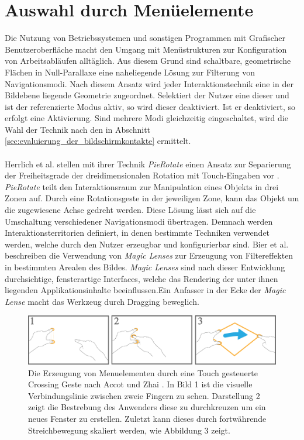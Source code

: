 \section{Auswahl durch Menüelemente}
\label{sec:menu_elemente}

Die Nutzung von Betriebssystemen und sonstigen Programmen mit Grafischer Benutzeroberfläche macht den Umgang mit Menüstrukturen zur Konfiguration von Arbeitsabläufen alltäglich. Aus diesem Grund sind schaltbare, geometrische Flächen in Null-Parallaxe eine naheliegende Lösung zur Filterung von Navigationsmodi. Nach diesem Ansatz wird jeder Interaktionstechnik eine in der Bildebene liegende Geometrie zugeordnet. Selektiert der Nutzer eine dieser und ist der referenzierte Modus aktiv, so wird dieser deaktiviert. Ist er deaktiviert, so erfolgt eine Aktivierung. Sind mehrere Modi gleichzeitig eingeschaltet, wird die Wahl der Technik nach den in Abschnitt \ref{sec:evaluierung_der_bildschirmkontakte} ermittelt.   
\\\\
Herrlich et al. stellen mit ihrer Technik \emph{PieRotate} einen Ansatz zur Separierung der Freiheitsgrade der dreidimensionalen Rotation mit Touch-Eingaben vor \cite{herrlich:2011}. \emph{PieRotate} teilt den Interaktionsraum zur Manipulation eines Objekts in drei Zonen auf. Durch eine Rotationsgeste in der jeweiligen Zone, kann das Objekt um die zugewiesene Achse gedreht werden. Diese Lösung lässt sich auf die Umschaltung verschiedener Navigationsmodi übertragen. Demnach werden Interaktionsterritorien definiert, in denen bestimmte Techniken verwendet werden, welche durch den Nutzer erzeugbar und konfigurierbar sind. Bier et al. beschreiben die Verwendung von \emph{Magic Lenses} zur Erzeugung von Filtereffekten in bestimmten Arealen des Bildes. 
\emph{Magic Lenses} sind nach dieser Entwicklung durchsichtige, fensterartige Interfaces, welche das Rendering der unter ihnen liegenden Applikationsinhalte beeinflussen.\newpage Ein Anfasser in der Ecke der \emph{Magic Lense} macht das Werkzeug durch Dragging beweglich.

\begin{figure}
	\begin{center}
		\includegraphics[width=12cm]{img/menu_geste.pdf}
	\end{center}
	\caption{Die Erzeugung von Menuelementen durch eine Touch gesteuerte Crossing Geste nach Accot und Zhai \cite{accot:2002}. In Bild 1 ist die visuelle Verbindungslinie zwischen zweie Fingern zu sehen. Darstellung 2 zeigt die Bestrebung des Anwenders diese zu durchkreuzen um ein neues Fenster zu erstellen. Zuletzt kann dieses durch fortwährende Streichbewegung skaliert werden, wie Abbildung 3 zeigt.}
	\label{fig:menu_geste}
\end{figure}

